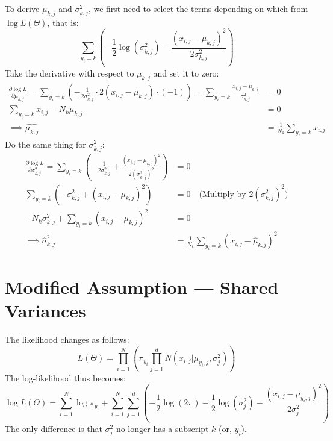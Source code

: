 \documentclass[11pt, a4paper, oneside]{memoir}
\begin{document}
To derive $\mu_{k,j}$ and $\sigma^2_{k,j}$, we first need to select the terms depending on which from $\log L(\Theta)$, that is:
\[ \sum_{y_i=k} \left( -\frac{1}{2} \log(\sigma^2_{k,j}) - \frac{(x_{i,j} - \mu_{k,j})^2}{2\sigma^2_{k,j}} \right) \]
Take the derivative with respect to $\mu_{k,j}$ and set it to zero:
\begin{align*}
    \frac{\partial \log L}{\partial \mu_{k,j}} = \sum_{y_i=k} \left( - \frac{1}{2\sigma^2_{k,j}} \cdot 2(x_{i,j} - \mu_{k,j}) \cdot (-1) \right)
    = \sum_{y_i=k} \frac{x_{i,j} - \mu_{k,j}}{\sigma^2_{k,j}} & = 0                                  \\
    \sum_{y_i=k} x_{i,j} - N_k \mu_{k,j}                      & = 0                                  \\
    \implies \hat{\mu_{k,j}}                                  & = \frac{1}{N_k} \sum_{y_i=k} x_{i,j}
\end{align*}
Do the same thing for $\sigma^2_{k,j}$:
\begin{align*}
    \frac{\partial \log L}{\partial \sigma^2_{k,j}} = \sum_{y_i=k} \left( -\frac{1}{2\sigma^2_{k,j}} + \frac{(x_{i,j} - \mu_{k,j})^2}{2(\sigma^2_{k,j})^2} \right) & = 0                                                         \\
    \sum_{y_i=k} \left( -\sigma^2_{k,j} + (x_{i,j} - \mu_{k,j})^2 \right)                                                                                          & = 0 \quad \text{(Multiply by } 2(\sigma^2_{k,j})^2 \text{)} \\
    -N_k \sigma^2_{k,j} + \sum_{y_i=k} (x_{i,j} - \mu_{k,j})^2                                                                                                     & = 0                                                         \\
    \implies \hat{\sigma}^2_{k,j}                                                                                                                                  & = \frac{1}{N_k} \sum_{y_i=k} (x_{i,j} - \hat{\mu}_{k,j})^2
\end{align*}

\section{Modified Assumption — Shared Variances}
The likelihood changes as follows:
\[ L(\Theta) = \prod_{i=1}^{N} \left( \pi_{y_i} \prod_{j=1}^{d} N(x_{i,j} | \mu_{y_i,j}, \sigma^2_{j}) \right) \]
The log-likelihood thus becomes:
\[ \log L(\Theta) = \sum_{i=1}^{N} \log \pi_{y_i} + \sum_{i=1}^{N} \sum_{j=1}^{d} \left( -\frac{1}{2} \log(2\pi) - \frac{1}{2} \log(\sigma^2_{j}) - \frac{(x_{i,j} - \mu_{y_i,j})^2}{2\sigma^2_{j}} \right) \]
The only difference is that $\sigma^2_j$ no longer has a subscript $k$ (or, $y_i$).
\end{document}
